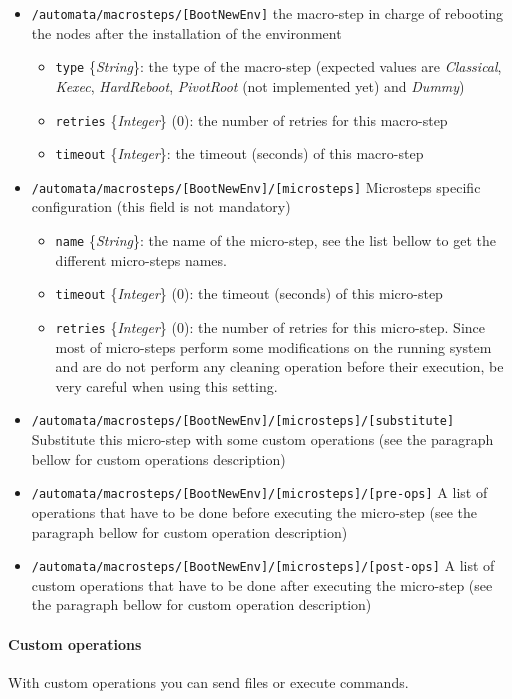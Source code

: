 \documentclass[a4wide,10pt,oneside]{book}
\newcommand{\ypath}[1]{\texttt{#1}}
\newcommand{\yfield}[2]{\texttt{#1} {\small\{{\emph{#2}}\}}:}
\newcommand{\yfieldd}[3]{\texttt{#1} {\small\{{\emph{#2}}\}} {\small(}#3{\small)}:}
\begin{document}
\begin{itemize}
  \item \ypath{/automata/macrosteps/[BootNewEnv]} the macro-step in charge of rebooting the nodes after the installation of the environment
  \begin{itemize}
    \item \yfield{type}{String} the type of the macro-step (expected values are \emph{Classical}, \emph{Kexec}, \emph{HardReboot}, \emph{PivotRoot} (not implemented yet) and \emph{Dummy})
    \item \yfieldd{retries}{Integer}{0} the number of retries for this macro-step
    \item \yfield{timeout}{Integer} the timeout (seconds) of this macro-step
  \end{itemize}
  \item \ypath{/automata/macrosteps/[BootNewEnv]/[microsteps]} Microsteps specific configuration (this field is not mandatory)
  \begin{itemize}
    \item \yfield{name}{String} the name of the micro-step, see the list bellow to get the different micro-steps names.
    \item \yfieldd{timeout}{Integer}{0} the timeout (seconds) of this micro-step
    \item \yfieldd{retries}{Integer}{0} the number of retries for this micro-step. Since most of micro-steps perform some modifications on the running system and are do not perform any cleaning operation before their execution, be very careful when using this setting.
  \end{itemize}
  \item \ypath{/automata/macrosteps/[BootNewEnv]/[microsteps]/[substitute]} Substitute this micro-step with some custom operations (see the paragraph bellow for custom operations description)
  \item \ypath{/automata/macrosteps/[BootNewEnv]/[microsteps]/[pre-ops]} A list of operations that have to be done before executing the micro-step (see the paragraph bellow for custom operation description)
  \item \ypath{/automata/macrosteps/[BootNewEnv]/[microsteps]/[post-ops]} A list of custom operations that have to be done after executing the micro-step (see the paragraph bellow for custom operation description)
\end{itemize}
\paragraph{Custom operations\label{custom-op}\\}
With custom operations you can send files or execute commands.
\end{document}
